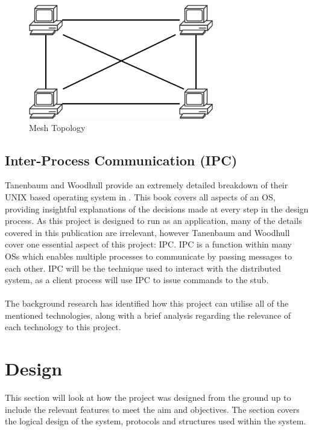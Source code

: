 \documentclass[a4paper, 11pt]{report}
\begin{document}
\begin{figure}[H]
\centering
\includegraphics[height=5cm,keepaspectratio]{mesh}
\caption{Mesh Topology} 
\label{fig:mesh}
\end{figure}

\section{Inter-Process Communication (IPC)}
Tanenbaum and Woodhull provide an extremely detailed breakdown of their UNIX based operating system in  \cite{operatingsystems}. This book covers all aspects of an \acrshort{OS}, providing insightful explanations of the decisions made at every step in the design process. As this project is designed to run as an application, many of the details covered in this publication are irrelevant, however Tanenbaum and Woodhull cover one essential aspect of this project: \acrfull{IPC}. \acrshort{IPC} is a function within many \acrlong{OS}s which enables multiple processes to communicate by passing messages to each other. \acrshort{IPC} will be the technique used to interact with the distributed system, as a client process will use \acrshort{IPC} to issue commands to the \gls{stub}. \\\\

The background research has identified how this project can utilise all of the mentioned technologies, along with a brief analysis regarding the relevance of each technology to this project.

\chapter{Design}

This section will look at how the project was designed from the ground up to include the relevant features to meet the aim and objectives. The section covers the logical design of the system, protocols and structures used within the system.
\end{document}
